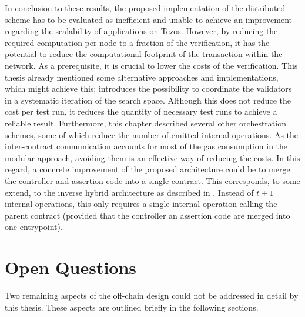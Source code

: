 In conclusion to these results, the proposed implementation of the distributed scheme has to be evaluated as inefficient and unable to achieve an improvement regarding the scalability of applications on Tezos. However, by reducing the required computation per node to a fraction of the verification, it has the potential to reduce the computational footprint of the transaction within the network. As a prerequisite, it is crucial to lower the costs of the verification. This thesis already mentioned some alternative approaches and implementations, which might achieve this;  introduces the possibility to coordinate the validators in a systematic iteration of the search space. Although this does not reduce the cost per test run, it reduces the quantity of necessary test runs to achieve a reliable result. Furthermore, this chapter described several other orchestration schemes, some of which reduce the number of emitted internal operations. As the inter-contract communication accounts for most of the gas consumption in the modular approach, avoiding them is an effective way of reducing the costs. In this regard, a concrete improvement of the proposed architecture could be to merge the controller and assertion code into a single contract. This corresponds, to some extend, to the inverse hybrid architecture as described in . Instead of $t+1$ internal operations, this only requires a single internal operation calling the parent contract (provided that the controller an assertion code are merged into one entrypoint).

\section{Open Questions}
Two remaining aspects of the off-chain design could not be addressed in detail by this thesis. These aspects are outlined briefly in the following sections.

